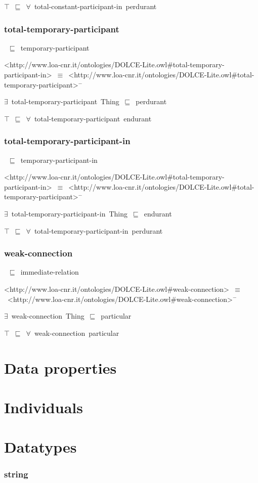 \documentclass{article}
\begin{document}
\ensuremath{\top}~\ensuremath{\sqsubseteq}~\ensuremath{\forall}~total-constant-participant-in~perdurant

\subsubsection*{total-temporary-participant}

~\ensuremath{\sqsubseteq}~temporary-participant

<http://www.loa-cnr.it/ontologies/DOLCE-Lite.owl#total-temporary-participant-in>~\ensuremath{\equiv}~<http://www.loa-cnr.it/ontologies/DOLCE-Lite.owl#total-temporary-participant>\ensuremath{^-}

\ensuremath{\exists}~total-temporary-participant~Thing~\ensuremath{\sqsubseteq}~perdurant

\ensuremath{\top}~\ensuremath{\sqsubseteq}~\ensuremath{\forall}~total-temporary-participant~endurant

\subsubsection*{total-temporary-participant-in}

~\ensuremath{\sqsubseteq}~temporary-participant-in

<http://www.loa-cnr.it/ontologies/DOLCE-Lite.owl#total-temporary-participant-in>~\ensuremath{\equiv}~<http://www.loa-cnr.it/ontologies/DOLCE-Lite.owl#total-temporary-participant>\ensuremath{^-}

\ensuremath{\exists}~total-temporary-participant-in~Thing~\ensuremath{\sqsubseteq}~endurant

\ensuremath{\top}~\ensuremath{\sqsubseteq}~\ensuremath{\forall}~total-temporary-participant-in~perdurant

\subsubsection*{weak-connection}

~\ensuremath{\sqsubseteq}~immediate-relation

<http://www.loa-cnr.it/ontologies/DOLCE-Lite.owl#weak-connection>~\ensuremath{\equiv}~<http://www.loa-cnr.it/ontologies/DOLCE-Lite.owl#weak-connection>\ensuremath{^-}

\ensuremath{\exists}~weak-connection~Thing~\ensuremath{\sqsubseteq}~particular

\ensuremath{\top}~\ensuremath{\sqsubseteq}~\ensuremath{\forall}~weak-connection~particular

\section*{Data properties}\section*{Individuals}\section*{Datatypes}\subsubsection*{string}
\end{document}
